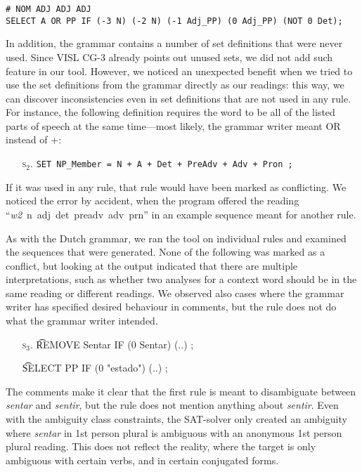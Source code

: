 {{\begin{itemize}
\begin{verbatim}
# NOM ADJ ADJ ADJ
SELECT A OR PP IF (-3 N) (-2 N) (-1 Adj_PP) (0 Adj_PP) (NOT 0 Det);
\end{verbatim}
\end{itemize}


In addition, the grammar contains a number of set definitions that were never
used. Since VISL CG-3 already points out unused sets, we did not add such
feature in our tool. However, we noticed an unexpected benefit when
we tried to use the set definitions from the grammar directly as our
readings: this way, we can discover inconsistencies even in
set definitions that are not used in any rule.
For instance, the following definition requires the word to be all of
the listed parts of speech at the same time---most likely, the grammar writer meant 
OR instead of +:
\begin{itemize}
\item[\textsc{s$_2$.}] 
\texttt{SET NP\_Member = N + A + Det + PreAdv + Adv + Pron ;}
\end{itemize}

If it was used in any rule, that rule would have been marked as
conflicting. We noticed the error by accident, when the program
offered the reading ``\emph{w2}~n~adj~det~preadv~adv~prn''
in an example sequence meant for another rule.


As with the Dutch grammar, we ran the tool on individual rules and
examined the sequences that were generated. None of the following was
marked as a conflict, but looking at the output indicated that there
are multiple interpretations, such as whether two analyses for a
context word should be in the same reading or different readings.
We observed also cases where the grammar writer has specified desired
behaviour in comments, but the rule does not do what the grammar
writer intended. 

\begin{itemize}
\item[\textsc{s$_3$.}] \t{REMOVE Sentar IF (0 Sentar) (..) ;}
\item[] \t{SELECT PP IF (0 "estado") (..) ;}
\end{itemize}

The comments make it clear that the first rule is meant to
disambiguate between \emph{sentar} and \emph{sentir}, but the rule
does not mention anything about \emph{sentir}. 
Even with the ambiguity class constraints, the SAT-solver only created
an ambiguity where \emph{sentar} in 1st person plural is ambiguous
with an anonymous 1st person plural reading. 
This does not reflect the reality, where the target is only ambiguous
with certain verbs, and in certain conjugated forms. 

}}
